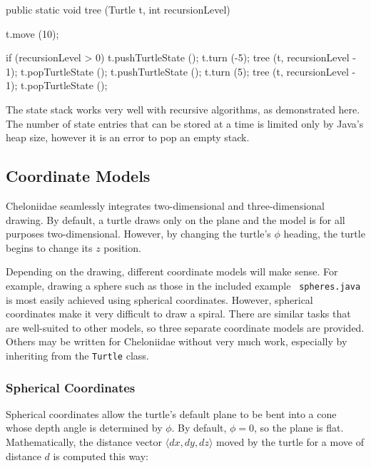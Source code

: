 \documentclass{article}
\begin{document}
      \begin{java}
public static void tree (Turtle t, int recursionLevel) {
  t.move (10);

  if (recursionLevel > 0) {
    t.pushTurtleState ();
    t.turn (-5);
    tree (t, recursionLevel - 1);
    t.popTurtleState ();
    t.pushTurtleState ();
    t.turn (5);
    tree (t, recursionLevel - 1);
    t.popTurtleState ();
  }
}
      \end{java}
      
      The state stack works very well with recursive algorithms, as demonstrated
      here. The number of state entries that can be stored at a time is limited
      only by Java's heap size, however it is an error to pop an empty stack.

    \subsection{Coordinate Models}
      \label{sec:coordinate-models}

      Cheloniidae seamlessly integrates two-dimensional and three-dimensional
      drawing. By default, a turtle draws only on the plane and the model is for
      all purposes two-dimensional. However, by changing the turtle's $\phi$
      heading, the turtle begins to change its $z$ position.

      Depending on the drawing, different coordinate models will make sense. For
      example, drawing a sphere such as those in the included example {\tt
      spheres.java} is most easily achieved using spherical coordinates. However,
      spherical coordinates make it very difficult to draw a spiral. There are
      similar tasks that are well-suited to other models, so three separate
      coordinate models are provided. Others may be written for Cheloniidae without
      very much work, especially by inheriting from the {\tt Turtle} class.

      \subsubsection{Spherical Coordinates}
	\label{sec:z-spherical}
	\label{sec:spherical-coordinates}

	Spherical coordinates allow the turtle's default plane to be bent into a
	cone whose depth angle is determined by $\phi$. By default, $\phi=0$, so
	the plane is flat. Mathematically, the distance vector $\langle dx, dy,
	dz\rangle$ moved by the turtle for a move of distance $d$ is computed
	this way:
\end{document}
